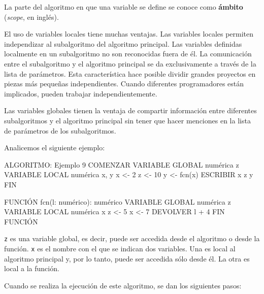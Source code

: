 \documentclass[
]{book}
\newenvironment{Shaded}{\begin{snugshade}}{\end{snugshade}}
\newcommand{\NormalTok}[1]{#1}
\begin{document}
La parte del algoritmo en que una variable se define se conoce como \textbf{ámbito} (\emph{scope}, en inglés).

El uso de variables locales tiene muchas ventajas. Las variables locales permiten independizar al subalgoritmo del algoritmo principal. Las variables definidas localmente en un subalgoritmo no son reconocidas fuera de él. La comunicación entre el subalgoritmo y el algoritmo principal se da exclusivamente a través de la lista de parámetros. Esta característica hace posible dividir grandes proyectos en piezas más pequeñas independientes. Cuando diferentes programadores están implicados, pueden trabajar
independientemente.

Las variables globales tienen la ventaja de compartir información entre diferentes subalgoritmos y el algoritmo principal sin tener que hacer menciones en la lista de parámetros de los subalgoritmos.

Analicemos el siguiente ejemplo:

\begin{Shaded}
\begin{Highlighting}[]
\NormalTok{ALGORITMO: Ejemplo 9}
\NormalTok{COMENZAR}
\NormalTok{    VARIABLE GLOBAL numérica z}
\NormalTok{    VARIABLE LOCAL numérica x, y}
\NormalTok{    x \textless{}{-} 2}
\NormalTok{    z \textless{}{-} 10}
\NormalTok{    y \textless{}{-} fcn(x)}
\NormalTok{    ESCRIBIR x z y}
\NormalTok{FIN}

\NormalTok{FUNCIÓN fcn(l: numérico): numérico}
\NormalTok{    VARIABLE GLOBAL numérica z}
\NormalTok{    VARIABLE LOCAL numérica x}
\NormalTok{    z \textless{}{-} 5}
\NormalTok{    x \textless{}{-} 7}
\NormalTok{    DEVOLVER l + 4}
\NormalTok{FIN FUNCIÓN}
\end{Highlighting}
\end{Shaded}

\texttt{z} es una variable global, es decir, puede ser accedida desde el algoritmo o desde la función. \texttt{x} es el nombre con el que se indican dos variables. Una es local al algoritmo principal y, por lo tanto, puede ser accedida sólo desde él. La otra es local a la función.

Cuando se realiza la ejecución de este algoritmo, se dan los siguientes pasos:
\end{document}
